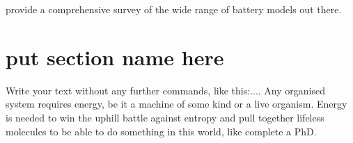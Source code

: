 
\ifpdf
    \graphicspath{{1_introduction/figures/PNG/}{1_introduction/figures/PDF/}{1_introduction/figures/}}
\else
    \graphicspath{{1_introduction/figures/EPS/}{1_introduction/figures/}}
\fi





\cite{Seaman2014} provide a comprehensive survey of the wide range of battery models out there.

\section{put section name here} %
Write your text without any further commands, like this:.... Any organised system requires energy, be it a machine of some kind or a live organism. Energy is needed to win the uphill battle against entropy and pull together lifeless molecules to be able to do something in this world, like complete a PhD.



